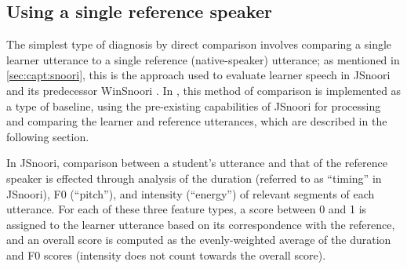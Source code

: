 	
	\subsection{Using a single reference speaker}
	\label{sec:compare:single}
	
	
	The simplest type of diagnosis by direct comparison involves comparing a single learner utterance to a single reference (native-speaker) utterance; as mentioned in \cref{sec:capt:snoori}, this is the approach used to evaluate learner speech in JSnoori and its predecessor WinSnoori \citep{Bonneau2004,Henry2007,Bonneau2011}. 
	In , this method of comparison is implemented as a type of baseline, using the pre-existing capabilities of JSnoori for processing and comparing the learner and reference utterances, which are described in the following section. 
	
	
	In JSnoori, comparison between a student's utterance and that of the reference speaker is effected through analysis of the duration (referred to as ``timing'' in JSnoori), F0 (``pitch''), and intensity (``energy'') of relevant segments of each utterance. 
	For each of these three feature types, a score between 0 and 1 is assigned to the learner utterance based on its correspondence with the reference, and an overall score is computed as the evenly-weighted average of the duration and F0 scores (intensity does not count towards the overall score). 
	
	
